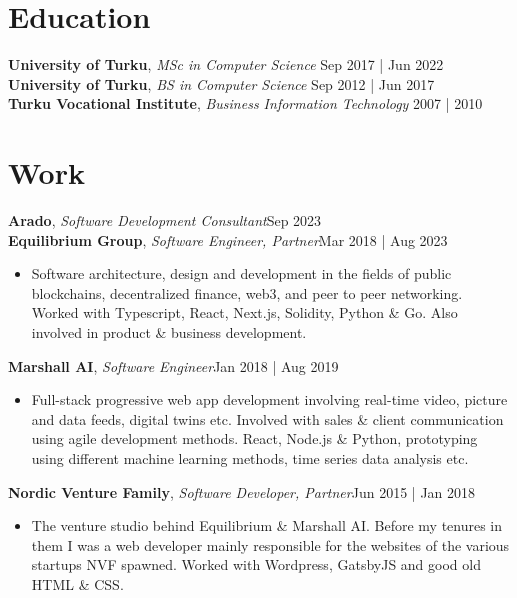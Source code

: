 \documentclass[line,margin]{res}
\begin{document}
\address{jani.anttonen@protonmail.ch | +358 40 589 0039 | Turku, Finland | https://janianttonen.com}

\begin{resume}
	\vspace{-5mm}

	\section{Education}
	\textbf{University of Turku}, {\sl MSc in Computer Science} \hfill Sep 2017 | Jun 2022\\
	\textbf{University of Turku}, {\sl BS in Computer Science} \hfill Sep 2012 | Jun 2017\\
	\textbf{Turku Vocational Institute}, {\sl Business Information Technology} \hfill 2007 | 2010\\

	\section{Work}
	\textbf{Arado}, {\sl Software Development Consultant}\hfill Sep 2023\\

	\textbf{Equilibrium Group}, {\sl Software Engineer, Partner}\hfill Mar 2018 | Aug 2023\\
	\begin{itemize} \itemsep 3pt
	\item Software architecture, design and development in the fields of public blockchains, decentralized finance, web3, and peer to peer networking. Worked with Typescript, React, Next.js, Solidity, Python \& Go. Also involved in product \& business development.
	\end{itemize}

	\textbf{Marshall AI}, {\sl Software Engineer}\hfill Jan 2018 | Aug 2019\\
	\begin{itemize} \itemsep 3pt
	\item Full-stack progressive web app development involving real-time video, picture and data feeds, digital twins etc. Involved with sales \& client communication using agile development methods. React, Node.js \& Python, prototyping using different machine learning methods, time series data analysis etc.
	\end{itemize}

	\textbf{Nordic Venture Family}, {\sl Software Developer, Partner}\hfill Jun 2015 | Jan 2018\\
	\begin{itemize} \itemsep 3pt
	\item The venture studio behind Equilibrium \& Marshall AI. Before my tenures in them I was a web developer mainly responsible for the websites of the various startups NVF spawned. Worked with Wordpress, GatsbyJS and good old HTML \& CSS.
	\end{itemize}


\end{resume}
\end{document}
